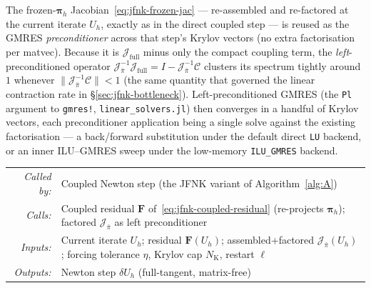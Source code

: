 \documentclass{article}
\makeatletter
\newcommand{\code}[1]{\texttt{\small #1}}
\newcommand{\moduleinterface}[4]{%
\begin{interfacecard}
\footnotesize
\begin{tabular}{@{}r@{\quad}p{0.82\textwidth}@{}}
\textit{Called by:} & #1 \\
\textit{Calls:}     & #2 \\
\textit{Inputs:}    & #3 \\
\textit{Outputs:}   & #4 \\
\end{tabular}
\end{interfacecard}
}
\makeatother
\begin{document}
The frozen-$\boldsymbol{\pi}_h$ Jacobian~\eqref{eq:jfnk-frozen-jac} ---
re-assembled and re-factored at the current iterate $U_h$, exactly as in
the direct coupled step --- is reused as the GMRES \emph{preconditioner}
across that step's Krylov vectors (no extra factorisation per matvec).
Because it is $\mathcal{J}_{\mathrm{full}}$ minus only the compact coupling
term, the \emph{left}-preconditioned operator
$\mathcal{J}_{\bar\pi}^{-1}\mathcal{J}_{\mathrm{full}}
 = I - \mathcal{J}_{\bar\pi}^{-1}\mathcal{C}$
clusters its spectrum tightly around $1$ whenever
$\|\mathcal{J}_{\bar\pi}^{-1}\mathcal{C}\| < 1$ (the same quantity that
governed the linear contraction rate in §\ref{sec:jfnk-bottleneck}).
Left-preconditioned GMRES (the \code{Pl} argument to \code{gmres!},
\code{linear\_solvers.jl}) then converges in a handful of Krylov vectors,
each preconditioner application being a single solve against the existing
factorisation --- a back/forward substitution under the default direct
\code{LU} backend, or an inner ILU--GMRES sweep under the low-memory
\code{ILU\_GMRES} backend.

\moduleinterface
    {Coupled Newton step (the JFNK variant of Algorithm~\ref{alg:A})}
    {Coupled residual $\boldsymbol{F}$ of~\eqref{eq:jfnk-coupled-residual} (re-projects $\boldsymbol{\pi}_h$); factored $\mathcal{J}_{\bar\pi}$ as left preconditioner}
    {Current iterate $U_h$; residual $\boldsymbol{F}(U_h)$; assembled+factored $\mathcal{J}_{\bar\pi}(U_h)$; forcing tolerance $\eta$, Krylov cap $N_{\mathrm{K}}$, restart $\ell$}
    {Newton step $\delta U_h$ (full-tangent, matrix-free)}
\end{document}
